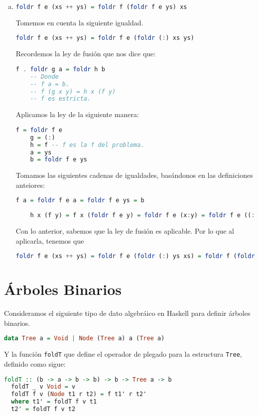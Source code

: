 \documentclass[spanish,12pt,letterpaper]{article}
\begin{document}
\begin{enumerate}[(a)]
\item
  \begin{lstlisting}[language=Haskell]
    foldr f e (xs ++ ys) = foldr f (foldr f e ys) xs 
  \end{lstlisting}
  Tomemos en cuenta la siguiente igualdad.
  \begin{lstlisting}[language=Haskell]
    foldr f e (xs ++ ys) = foldr f e (foldr (:) xs ys)
  \end{lstlisting}
  Recordemos la ley de fusión que nos dice que:
  \begin{lstlisting}[language=Haskell]
    f . foldr g a = foldr h b
    -- Donde
    -- f a = b.
    -- f (g x y) = h x (f y)
    -- f es estricta.
  \end{lstlisting}
  Aplicamos la ley de la siguiente manera:
  \begin{lstlisting}[language=Haskell]
    f = foldr f e
    g = (:)
    h = f -- f es la f del problema.
    a = ys
    b = foldr f e ys
  \end{lstlisting}
  Tomamos las siguientes cadenas de igualdades, basándonos en las definiciones
  anteiores:
  \begin{lstlisting}[language=Haskell]
    f a = foldr f e a = foldr f e ys = b
    
    h x (f y) = f x (foldr f e y) = foldr f e (x:y) = foldr f e ((:) x y) = foldr f e (g x y) = f (g x y).
  \end{lstlisting}
  Con lo anterior, sabemos que la ley de fusión es aplicable. Por lo que al
  aplicarla, tenemos que
  \begin{lstlisting}[language=Haskell]
    foldr f e (xs ++ ys) = foldr f e (foldr (:) ys xs) = foldr f (foldr f e ys)xs
  \end{lstlisting}
\end{enumerate}

\section{Árboles Binarios}

Consideramos el siguiente tipo de dato algebráico en Haskell para definir árboles
binarios.
\begin{lstlisting}[language=Haskell]
  data Tree a = Void | Node (Tree a) a (Tree a)
\end{lstlisting}

Y la función \texttt{foldT} que define el operador de plegado para la estructura
\texttt{Tree}, definido como sigue:

\begin{lstlisting}[language=Haskell]
  foldT :: (b -> a -> b -> b) -> b -> Tree a -> b
  foldT _ v Void = v
  foldT f v (Node t1 r t2) = f t1' r t2'
  where t1' = foldT f v t1
  t2' = foldT f v t2
\end{lstlisting}
\end{document}
